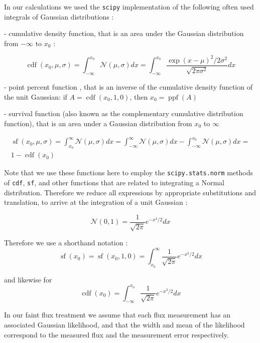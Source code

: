 \documentclass[fleqn,usenatbib]{mnras}  %
\DeclareMathOperator\cdf{cdf}
\DeclareMathOperator\sf{sf}
\DeclareMathOperator\ppf{ppf}
\begin{document}
In our calculations we used the  \verb|scipy| implementation of 
the following often used integrals of Gaussian distributions : 

- cumulative density function, that is an area under the Gaussian distribution from $-\infty$ to $x_{0}$ :

\begin{equation}
\cdf(x_{0}, \mu, \sigma) = \int_{-\infty}^{x_{0}}{\mathcal{N}(\mu,\sigma)dx} = \int_{-\infty}^{x_{0}}{\frac{\exp{(x-\mu)^{2} / 2\sigma^{2}}}{\sqrt{2\pi\sigma^{2}}} dx}
\end{equation}


- point percent function , that is an inverse of the cumulative density function of the unit Gaussian:  if  $A = \cdf(x_{0}, 1, 0)$, then  $x_{0} = \ppf(A)$

- survival function (also known  as the complementary cumulative distribution function), that is an area under a Gaussian distribution from $x_{0}$ to $\infty$

\begin{multline}
\sf(x_{0}, \mu, \sigma) =  \int_{x_{0}}^{\infty}{\mathcal{N}(\mu,\sigma)dx} =  \int_{-\infty}^{\infty}{\mathcal{N}(\mu,\sigma)dx} -  \int_{-\infty}^{x_{0}}{\mathcal{N}(\mu,\sigma)dx} = \\
1 - \cdf(x_{0})
\end{multline}

Note that we use these functions here to employ the \verb|scipy.stats.norm| methods of \verb|cdf|, \verb|sf|, and other functions that are related to integrating a Normal distribution.  Therefore we reduce all expressions by appropriate substitutions and translation, to arrive at the integration of a unit Gaussian :

\begin{equation}
\mathcal{N}(0,1) = \frac{1}{\sqrt{2\pi}} e^{-x^{2}/2}dx
\end{equation}

Therefore we use a shorthand notation :  
\begin{equation}
\sf(x_{0}) = \sf(x_{0},1,0) =  \int_{x_{0}}^{\infty}{\frac{1}{\sqrt{2\pi}} e^{-x^{2}/2}dx}
\end{equation}

 and likewise for
\begin{equation} 
 \cdf(x_{0}) =  \int_{-\infty}^{x_{0}}{   \frac{1}{\sqrt{2\pi}} e^{-x^{2}/2} dx} 
\end{equation}

In our faint flux treatment  we assume that each flux measurement has an associated Gaussian likelihood, and that the width and mean of the likelihood correspond to the measured flux and the measurement error respectively. 
\end{document}
